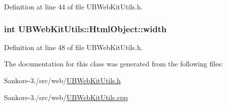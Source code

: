 Definition at line 44 of file U\-B\-Web\-Kit\-Utils.\-h.

\hypertarget{class_u_b_web_kit_utils_1_1_html_object_aabe5961432321a8beaf2a389652d0436}{
\subsubsection[{width}]{\setlength{\rightskip}{0pt plus 5cm}int U\-B\-Web\-Kit\-Utils\-::\-Html\-Object\-::width}}\label{dc/d35/class_u_b_web_kit_utils_1_1_html_object_aabe5961432321a8beaf2a389652d0436}


Definition at line 48 of file U\-B\-Web\-Kit\-Utils.\-h.



The documentation for this class was generated from the following files\-:\begin{DoxyCompactItemize}
\item 
Sankore-\/3./src/web/\hyperlink{_u_b_web_kit_utils_8h}{U\-B\-Web\-Kit\-Utils.\-h}\item 
Sankore-\/3./src/web/\hyperlink{_u_b_web_kit_utils_8cpp}{U\-B\-Web\-Kit\-Utils.\-cpp}\end{DoxyCompactItemize}

